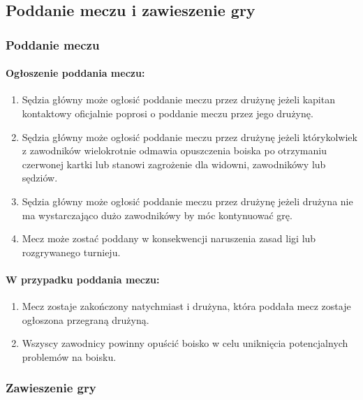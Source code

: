 \documentclass[12pt]{article}
\begin{document}
\subsection{Poddanie meczu i zawieszenie gry}

\subsubsection{Poddanie meczu}

\paragraph{Ogłoszenie poddania meczu:}

\begin{enumerate}
	\item
	      Sędzia główny może ogłosić poddanie meczu przez drużynę jeżeli kapitan
	      kontaktowy oficjalnie poprosi o poddanie meczu przez jego drużynę.
	\item
	      Sędzia główny może ogłosić poddanie meczu przez drużynę jeżeli
	      którykolwiek z zawodników wielokrotnie odmawia opuszczenia boiska po
	      otrzymaniu czerwonej kartki lub stanowi zagrożenie dla widowni,
	      zawodnikówy lub sędziów.
	\item
	      Sędzia główny może ogłosić poddanie meczu przez drużynę jeżeli drużyna
	      nie ma wystarczająco dużo zawodnikówy by móc kontynuować grę.
	\item
	      Mecz może zostać poddany w konsekwencji naruszenia zasad ligi lub
	      rozgrywanego turnieju.
\end{enumerate}

\paragraph{W przypadku poddania meczu:}

\begin{enumerate}
	\item
	      Mecz zostaje zakończony natychmiast i drużyna, która poddała mecz
	      zostaje ogłoszona przegraną drużyną.
	\item
	      Wszyscy zawodnicy powinny opuścić boisko w celu uniknięcia
	      potencjalnych problemów na boisku.
\end{enumerate}

\subsubsection{Zawieszenie gry}
\end{document}
